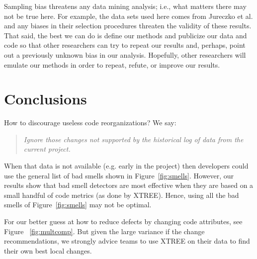 \documentclass[twocolumn,5p]{elsarticle}
\newcommand{\fig}[1]{Figure~\ref{fig:#1}}
\theoremstyle{break}
\begin{document}
	Sampling bias threatens any data mining analysis; i.e., what matters
	there may not be true here. For example, the data sets used here comes 
	from 
	Jureczko et al. and any biases in their selection procedures
	threaten the validity of these results.
	That said,
	the best we can do is define our methods and publicize our data and code so 
	that other researchers can
	try to repeat our results and, perhaps, point out a previously unknown bias
	in our analysis. Hopefully, other researchers will emulate our methods in
	order to repeat, refute, or improve our results.
	
	
	\section{Conclusions}
	\label{sect:conclusions}
	How to discourage useless code reorganizations?
	We say:
        \begin{quote}{\em Ignore those changes
            not supported by the historical log of data from
	the current project.}\end{quote}
	When that data is not available (e.g. early
	in the project) then developers could use the general list of
	bad smells shown in \fig{smells}. However,
	our results
	show that  bad smell detectors are most
	effective when they are based
	on a small handful of code metrics (as done by XTREE).
	Hence, using all the bad smells of \fig{smells} may not be optimal.
	
	For our better guess at how to reduce defects by changing code attributes,
	see  Figure ~\ref{fig:multcomp}. But given the large variance if the 
	change 
	recommendations, we strongly advice teams to use
	XTREE on their data to find their own best local changes.
	
\end{document}
